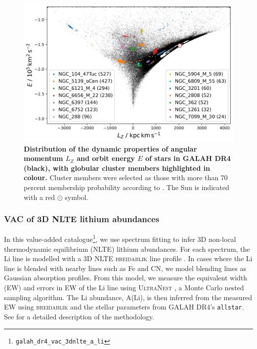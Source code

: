 \documentclass[
  journal=pasa,
  manuscript=research-paper, %
  year=2024,
  volume=37
]{cup-journal}
\newcommand{\breidablik}{\textsc{breidablik}\xspace}
\begin{document}
\begin{figure}[ht]
\includegraphics[width=\columnwidth]{figures/galah_dr4_lz_e_with_gcs.png}
\caption{
\textbf{Distribution of the dynamic properties of angular momentum $L_Z$ and orbit energy $E$ of stars in GALAH DR4 (black), with globular cluster members highlighted in colour.} Cluster members were selected as those with more than 70 percent membership probability according to \citet{Vasiliev2021}. The Sun is indicated with a red $\odot$ symbol.
}
\label{fig:galah_dr4_lz_e_with_gcs}
\end{figure}

\subsubsection{VAC of 3D NLTE lithium abundances}
\label{sec:VAC_li}

In this value-added catalogue\footnote{\texttt{galah\_dr4\_vac\_3dnlte\_a\_li}}, we use spectrum fitting to infer 3D non-local thermodynamic equilibrium (NLTE) lithium abundances. For each spectrum, the Li line is modelled with a 3D NLTE \breidablik line profile \citep{Wang2021}. In cases where the Li line is blended with nearby lines such as Fe and CN, we model blending lines as Gaussian absorption profiles. From this model, we measure the equivalent width (EW) and errors in EW of the Li line using \textsc{UltraNest} \citep{Buchner2021}, a Monte Carlo nested sampling algorithm. The Li abundance, A(Li), is then inferred from the measured EW using \breidablik and the stellar parameters from GALAH DR4's \texttt{allstar}. See \citet{Wang2024} for a detailed description of the methodology. 
\end{document}
